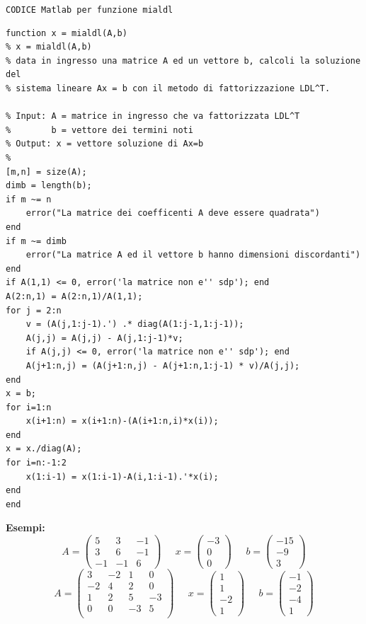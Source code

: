 \documentclass[12pt]{article}
\begin{document}
\texttt{CODICE Matlab per funzione mialdl}
\begin{lstlisting}[frame=single]
function x = mialdl(A,b)
% x = mialdl(A,b)
% data in ingresso una matrice A ed un vettore b, calcoli la soluzione del 
% sistema lineare Ax = b con il metodo di fattorizzazione LDL^T.

% Input: A = matrice in ingresso che va fattorizzata LDL^T
%        b = vettore dei termini noti
% Output: x = vettore soluzione di Ax=b
%
[m,n] = size(A);
dimb = length(b);
if m ~= n 
    error("La matrice dei coefficenti A deve essere quadrata")
end
if m ~= dimb
    error("La matrice A ed il vettore b hanno dimensioni discordanti")
end
if A(1,1) <= 0, error('la matrice non e'' sdp'); end
A(2:n,1) = A(2:n,1)/A(1,1);
for j = 2:n
    v = (A(j,1:j-1).') .* diag(A(1:j-1,1:j-1));
    A(j,j) = A(j,j) - A(j,1:j-1)*v;
    if A(j,j) <= 0, error('la matrice non e'' sdp'); end
    A(j+1:n,j) = (A(j+1:n,j) - A(j+1:n,1:j-1) * v)/A(j,j);
end
x = b;
for i=1:n
    x(i+1:n) = x(i+1:n)-(A(i+1:n,i)*x(i));
end
x = x./diag(A);
for i=n:-1:2
    x(1:i-1) = x(1:i-1)-A(i,1:i-1).'*x(i);
end 
end
\end{lstlisting}
\textbf{Esempi:}
\begin{equation}A=
    \begin{pmatrix}
        5 & 3 & -1 \\
        3 & 6 & -1 \\
        -1 & -1 & 6 
    \end{pmatrix}\;\;\;\;\;x=
    \begin{pmatrix}
        -3 \\
        0\\
        0  
    \end{pmatrix}\;\;\;\;\;b=
    \begin{pmatrix}
        -15 \\
        -9 \\
        3  
    \end{pmatrix}
\end{equation}
\begin{equation}
    A=
    \begin{pmatrix}
        3 & -2 & 1 & 0 \\
        -2 & 4 & 2 & 0 \\
        1 & 2 & 5 & -3 \\
        0 & 0 & -3 & 5 \\
    \end{pmatrix}\;\;\;\;\;x=
    \begin{pmatrix}
        1 \\
        1 \\
        -2 \\
        1 
    \end{pmatrix}\;\;\;\;\;b=
    \begin{pmatrix}
        -1 \\
        -2 \\
        -4 \\
        1 
    \end{pmatrix}
\end{equation}
\end{document}
